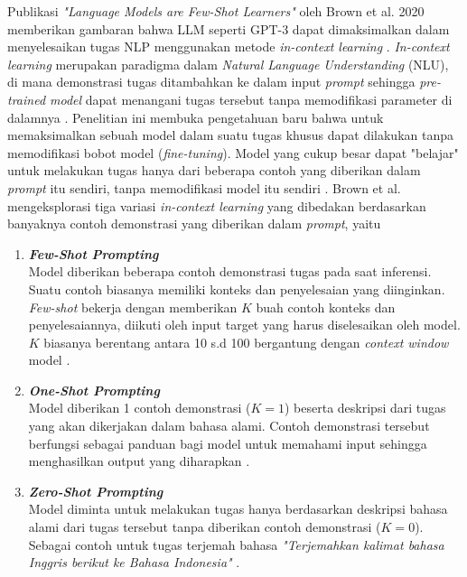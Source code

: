 Publikasi \textit{"Language Models are Few-Shot Learners"} oleh Brown et al. 2020 memberikan gambaran bahwa LLM seperti GPT-3 dapat dimaksimalkan dalam menyelesaikan tugas NLP menggunakan metode \textit{in-context learning} \cite{LLMisFewShot2020}.
\textit{In-context learning} merupakan paradigma dalam \textit{Natural Language Understanding} (NLU), di mana demonstrasi tugas ditambahkan ke dalam input \textit{prompt} sehingga \textit{pre-trained model} dapat menangani tugas tersebut tanpa memodifikasi parameter di dalamnya \cite{Dong2024SurveyInContextLearning}.
Penelitian ini membuka pengetahuan baru bahwa untuk memaksimalkan sebuah model dalam suatu tugas khusus dapat dilakukan tanpa memodifikasi bobot model (\textit{fine-tuning}).
Model yang cukup besar dapat "belajar" untuk melakukan tugas hanya dari beberapa contoh yang diberikan dalam \textit{prompt} itu sendiri, tanpa memodifikasi model itu sendiri \cite{LLMisFewShot2020}.
Brown et al. mengeksplorasi tiga variasi \textit{in-context learning} yang dibedakan berdasarkan banyaknya contoh demonstrasi yang diberikan dalam \textit{prompt}, yaitu

\begin{enumerate}
	\item \textbf{\textit{Few-Shot Prompting}} \\
	      Model diberikan beberapa contoh demonstrasi tugas pada saat inferensi. Suatu contoh biasanya memiliki konteks dan penyelesaian yang diinginkan.
	      \textit{Few-shot} bekerja dengan memberikan $K$ buah contoh konteks dan penyelesaiannya, diikuti oleh input target yang harus diselesaikan oleh model.
	      $K$ biasanya berentang antara 10 s.d 100 bergantung dengan \textit{context window} model \cite{LLMisFewShot2020}.
	\item \textbf{\textit{One-Shot Prompting}} \\
	      Model diberikan 1 contoh demonstrasi ($K=1$) beserta deskripsi dari tugas yang akan dikerjakan dalam bahasa alami.
	      Contoh demonstrasi tersebut berfungsi sebagai panduan bagi model untuk memahami input sehingga menghasilkan output yang diharapkan \cite{LLMisFewShot2020}.
	\item \textbf{\textit{Zero-Shot Prompting}} \\
	      Model diminta untuk melakukan tugas hanya berdasarkan deskripsi bahasa alami dari tugas tersebut tanpa diberikan contoh demonstrasi ($K = 0$).
	      Sebagai contoh untuk tugas terjemah bahasa \textit{"Terjemahkan kalimat bahasa Inggris berikut ke Bahasa Indonesia"} \cite{LLMisFewShot2020}.
\end{enumerate}

